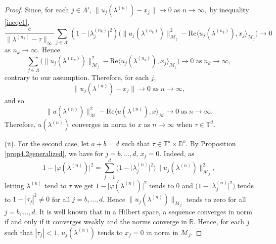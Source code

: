 \documentclass[10pt,a4paper]{amsart}
\begin{document}
\begin{proof}
Since, for each $j \in \Lambda'$, $\|u_{j}(\lambda^{(n)}) - x_j\| \rightarrow 0 $ as $n \rightarrow \infty,$
by inequality \eqref{ineqc1},
$$\dfrac{c}{\|\lambda^{(n_k)}-\tau\|_{\infty}}\sum_{j \in \Lambda'}(1-\lvert \lambda^{(n_k)}_{j} \rvert^{2})\Big(\|u_{j}(\lambda^{(n_k)})\|_{\mathcal{M}_{j}}^{2}-\mathrm{Re} \langle u_{j}(\lambda^{(n_k)}),x_{j}\rangle_{\mathcal{M}_{j}} \Big)
\rightarrow 0$$
 as  $n_k\rightarrow \infty$. Hence
$$ \sum_{j \in \Lambda}\Big(\|u_{j}(\lambda^{(n_k)})\|_{\mathcal{M}_{j}}^{2}-\mathrm{Re} \langle u_{j}(\lambda^{(n_k)}),x_{j}\rangle_{\mathcal{M}_{j}} \Big)\rightarrow 0 \; \text {as} \; n_k \rightarrow \infty,$$
contrary to our assumption. Therefore, for each $j$, 
$$\|u_{j}(\lambda^{(n)}) - x_j\| \rightarrow 0 \; \text{as} \; n \rightarrow \infty,$$
and so
 $$\|u(\lambda^{(n)})\|_{\mathcal{M}}^{2}-\mathrm{Re} \langle u(\lambda^{(n)}),x\rangle_{\mathcal{M}} \rightarrow 0 \; \text {as} \; n \rightarrow \infty.$$  
Therefore,  $u(\lambda^{(n)})$ converges in norm to $x$ as $n \rightarrow \infty$ when $\tau\in\mathbb{T}^{d}$.
 

 {\rm (ii)}. For the second case, let $a+b=d$ such that $\tau\in\mathbb{T}^{a}\times \mathbb{D}^{b}$. By Proposition \ref{prop4.2generalized}, we have for $j=b,\hdots, d$, $x_{j}=0$. Indeed, as 
$$1-\lvert \varphi(\lambda^{(n)})\rvert^{2}=\sum_{j=1}^{d}\big(1-\lvert \lambda_{j}^{(n)}\rvert^{2}\big)\|u_{j}(\lambda^{(n)})\|_{\mathcal{M}_{j}}^{2},$$
letting $\lambda^{(n)}$ tend to $\tau$ we get $1-\lvert \varphi(\lambda^{(n)})\rvert^{2}$ tends to $0$ and 
$\big(1-\lvert \lambda_{j}^{(n)}\rvert^{2}\big)$ tends to $1 -|\tau_j|^2 \neq 0$ for  all $j=b,\hdots, d$. Hence
 $\|u_{j}(\lambda^{(n)})\|_{\mathcal{M}_{j}}$ tends to zero for all $j=b,\hdots, d$. 
It is well known that in a Hilbert space, a sequence converges in norm if and only if it converges weakly and the norms converge in $\mathbb{R}$. Hence, for each $j$ such that $ |\tau_j| < 1$, $u_{j}(\lambda^{(n)})$ tends to  $x_{j}=0$ in norm in ${\mathcal{M}_{j}}$.


\end{proof}
\end{document}
